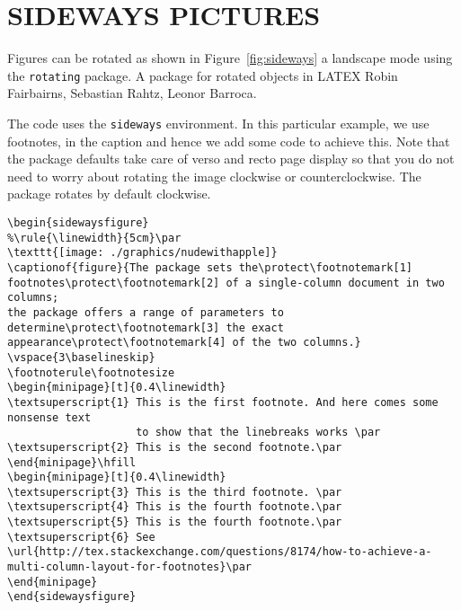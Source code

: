 \chapter{SIDEWAYS PICTURES}
Figures can be rotated as shown in Figure~\ref{fig:sideways}  a landscape mode using the \texttt{rotating} package. A package for rotated objects in LATEX
Robin Fairbairns, Sebastian Rahtz, Leonor Barroca.
%

The code uses the \verb!sideways! environment. In this particular example, we use footnotes, in the caption and hence we add some code to achieve this.  Note that the package defaults take care of verso and recto page display so that you do not need to   worry about rotating the image clockwise or counterclockwise. The package rotates by default clockwise.
\begin{verbatim}
\begin{sidewaysfigure}
%\rule{\linewidth}{5cm}\par
\texttt{[image: ./graphics/nudewithapple]}
\captionof{figure}{The package sets the\protect\footnotemark[1] footnotes\protect\footnotemark[2] of a single-column document in two columns;
the package offers a range of parameters to determine\protect\footnotemark[3] the exact appearance\protect\footnotemark[4] of the two columns.}
\vspace{3\baselineskip}
\footnoterule\footnotesize
\begin{minipage}[t]{0.4\linewidth}
\textsuperscript{1} This is the first footnote. And here comes some nonsense text
                    to show that the linebreaks works \par
\textsuperscript{2} This is the second footnote.\par
\end{minipage}\hfill
\begin{minipage}[t]{0.4\linewidth}
\textsuperscript{3} This is the third footnote. \par
\textsuperscript{4} This is the fourth footnote.\par
\textsuperscript{5} This is the fourth footnote.\par
\textsuperscript{6} See \url{http://tex.stackexchange.com/questions/8174/how-to-achieve-a-multi-column-layout-for-footnotes}\par
\end{minipage}
\end{sidewaysfigure}
\end{verbatim}

